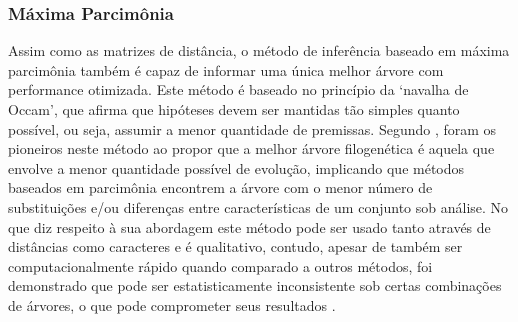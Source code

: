 \documentclass[english,brazilian]{UNISINOSmonografia} %
\begin{document}




\subsubsection{Máxima Parcimônia}


Assim como as matrizes de distância, o método de inferência baseado em máxima parcimônia também é capaz de informar uma única melhor árvore com performance otimizada.
Este método é baseado no princípio da \textquoteleft navalha de Occam\textquoteright, que afirma que hipóteses devem ser mantidas tão simples quanto possível, ou seja, assumir a menor quantidade de premissas.
Segundo ,  foram os pioneiros neste método ao propor que a melhor árvore filogenética é aquela que envolve a menor quantidade possível de evolução, implicando que métodos baseados em parcimônia encontrem a árvore com o menor número de substituições e/ou diferenças entre características de um conjunto sob análise.
No que diz respeito à sua abordagem este método pode ser usado tanto através de distâncias como caracteres e é qualitativo, contudo, apesar de também ser computacionalmente rápido quando comparado a outros métodos, foi demonstrado que pode ser estatisticamente inconsistente sob certas combinações de árvores, o que pode comprometer seus resultados \cite{Felsenstein1978}.



\end{document}
